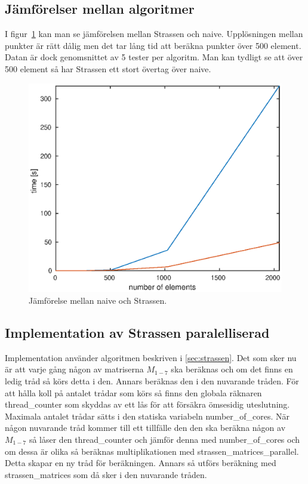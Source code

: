 \subsection{Jämförelser mellan algoritmer}
I figur~\ref{fig:comparison} kan man se jämförelsen mellan Strassen och naive. Upplösningen mellan punkter är rätt dålig men det tar lång tid att beräkna punkter över 500 element. Datan är dock genomsnittet av 5 tester per algoritm. Man kan tydligt se att över 500 element så har Strassen ett stort övertag över naive. 

\begin{figure}[H]
	\begin{center}
		\includegraphics[scale=0.6]{martin-tex/comparison.eps}
	\end{center}
	\caption{Jämförelse mellan naive och Strassen.}
	\label{fig:comparison}
\end{figure}

\subsection{Implementation av Strassen paralelliserad}
Implementation använder algoritmen beskriven i \ref{sec:strassen}. Det som sker nu är att varje gång någon av matriserna $M_{1-7}$ ska beräknas och om det finns en ledig tråd så körs detta i den. Annars beräknas den i den nuvarande tråden. För att hålla koll på antalet trådar som körs så finns den globala räknaren thread\_counter som skyddas av ett lås för att försäkra ömsesidig uteslutning. Maximala antalet trådar sätts i den statiska variabeln number\_of\_cores. När någon nuvarande tråd kommer till ett tillfälle den den ska beräkna någon av 
$M_{1-7}$ så låser den thread\_counter och jämför denna med number\_of\_cores och om dessa är olika så beräknas multiplikationen med strassen\_matrices\_parallel. Detta skapar en ny tråd för beräkningen. Annars så utförs beräkning med strassen\_matrices som då sker i den nuvarande tråden.

